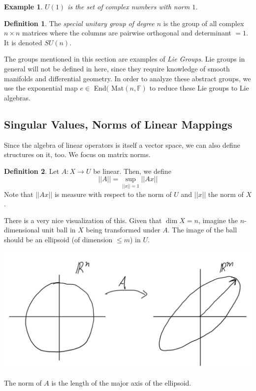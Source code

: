 \documentclass{article}
\newtheorem{example}{Example}[section]
\theoremstyle{remark}
\theoremstyle{definition}
\newtheorem{definition}{Definition}[section]
\begin{document}
\begin{example}
$U(1)$ is the set of complex numbers with norm $1$. 
\end{example}

\begin{definition}
The \textit{special unitary group of degree $n$} is the group of all complex $n \times n$ matrices where the columns are pairwise orthogonal and determinant $=1$. It is denoted $SU(n)$. 
\end{definition}

The groups mentioned in this section are examples of \textit{Lie Groups}. Lie groups in general will not be defined in here, since they require knowledge of smooth manifolds and differential geometry. In order to analyze these abstract groups, we use the exponential map $e \in$ End$($ Mat$(n, \mathbb{F})$ to reduce these Lie groups to Lie algebras.

\subsection{Singular Values, Norms of Linear Mappings}
Since the algebra of linear operators is itself a vector space, we can also define structures on it, too. We focus on matrix norms. 

\begin{definition}
Let $A: X \longrightarrow U$ be linear. Then, we define
\[||A|| = \sup_{||x||=1} ||A x||\]
Note that $||A x||$ is measure with respect to the norm of $U$ and $||x||$ the norm of $X$. 
\end{definition}

There is a very nice visualization of this. Given that $\dim{X}=n$, imagine the $n$-dimensional unit ball in $X$ being transformed under $A$. The image of the ball should be an ellipsoid (of dimension $\leq m$) in $U$. 
\begin{center}
    \includegraphics[scale=0.4]{Images/Matrix_Norm_Visualization.png}
\end{center}
The norm of $A$ is the length of the major axis of the ellipsoid. 
\end{document}
